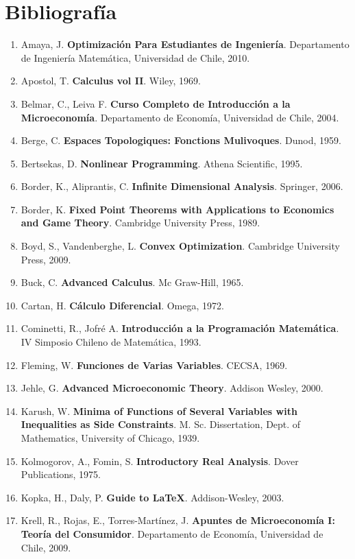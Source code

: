 \chapter*{Bibliograf\'ia}

\begin{enumerate}
\item Amaya, J. \textbf{Optimizaci\'on Para Estudiantes de Ingenier\'ia}. Departamento de Ingenier\'ia Matem\'atica, Universidad de Chile, 2010.
\item Apostol, T. \textbf{Calculus vol II}. Wiley, 1969.
\item Belmar, C., Leiva F. \textbf{Curso Completo de Introducci\'on a la Microeconom\'ia}. Departamento de Econom\'ia, Universidad de Chile, 2004.
\item Berge, C. \textbf{Espaces Topologiques: Fonctions Mulivoques}. Dunod, 1959.
\item Bertsekas, D. \textbf{Nonlinear Programming}. Athena Scientific, 1995.
\item Border, K., Aliprantis, C. \textbf{Infinite Dimensional Analysis}. Springer, 2006.
\item Border, K. \textbf{Fixed Point Theorems with Applications to Economics and Game Theory}. Cambridge University Press, 1989.
\item Boyd, S., Vandenberghe, L. \textbf{Convex Optimization}. Cambridge University Press, 2009.
\item Buck, C. \textbf{Advanced Calculus}. Mc Graw-Hill, 1965.
\item Cartan, H. \textbf{C\'alculo Diferencial}. Omega, 1972.
\item Cominetti, R., Jofr\'e A. \textbf{Introducci\'on a la Programaci\'on Matem\'atica}. IV Simposio Chileno de Matem\'atica, 1993. 
\item Fleming, W. \textbf{Funciones de Varias Variables}. CECSA, 1969.
\item Jehle, G. \textbf{Advanced Microeconomic Theory}. Addison Wesley, 2000.
\item Karush, W. \textbf{Minima of Functions of Several Variables with Inequalities as Side Constraints}. M. Sc. Dissertation, Dept. of Mathematics, University of Chicago, 1939.
\item Kolmogorov, A., Fomin, S. \textbf{Introductory Real Analysis}. Dover Publications, 1975.
\item Kopka, H., Daly, P. \textbf{Guide to \LaTeX}. Addison-Wesley, 2003. 
\item Krell, R., Rojas, E., Torres-Mart\'inez, J. \textbf{Apuntes de Microeconom\'ia I: Teor\'ia del Consumidor}. Departamento de Econom\'ia, Universidad de Chile, 2009.

\end{enumerate}
